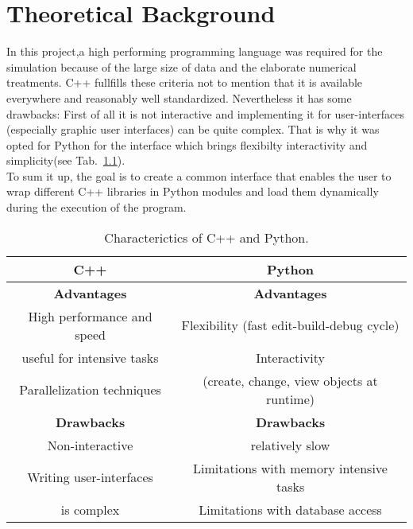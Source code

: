 \chapter{Theoretical Background}
\label{chapter:theory}

\setlength\parindent{12pt} In this project,a high performing programming language was required for the simulation because of the large size of data and the elaborate numerical treatments. C++ fullfills these criteria not to mention that it is available everywhere and reasonably well standardized. Nevertheless it has some drawbacks: First of all it is not interactive and implementing it for user-interfaces (especially graphic user interfaces) can be quite complex. That is why it was opted for Python for the interface which brings flexibilty interactivity and simplicity(see Tab.~\ref{table:settings}).\\
To sum it up, the goal is to create a common interface that enables the user to wrap different C++ libraries in Python modules and load them dynamically during the execution of the program.\\



\begin{table}[htb]
\centering
\begin{tabular}{|cc|}
\hline
\textbf{C++} & \textbf{Python}\\
\hline
\textbf{Advantages} & \textbf{Advantages} \\
High performance and speed & Flexibility (fast edit-build-debug cycle)
\\useful for intensive tasks & Interactivity\\

Parallelization techniques & (create, change, view objects at runtime) \\

\textbf{Drawbacks} & \textbf{Drawbacks} \\

Non-interactive & relatively slow\\
Writing user-interfaces & Limitations with memory intensive tasks\\
is complex &  Limitations with database access\\
\hline
\end{tabular}
\caption{Characterictics of C++ and Python.\label{table:settings}}

\end{table}